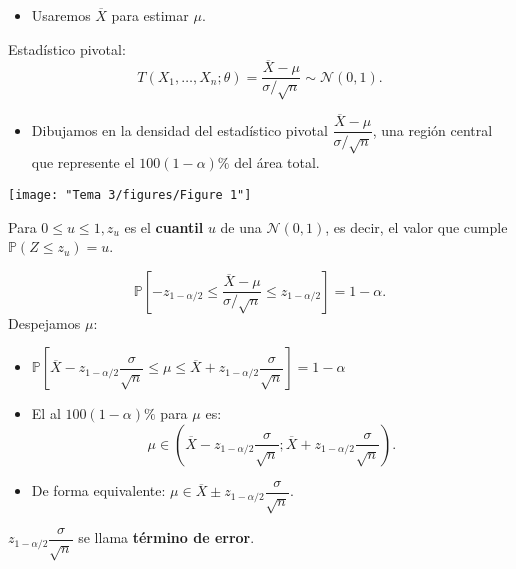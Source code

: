 \begin{itemize}[label=\textbullet]
    \item Usaremos $\overline{X}$ para estimar $\mu$.
\end{itemize}
Estadístico pivotal: \[
    T(X_1,\dots,X_n;\theta)=\dfrac{\overline{X}-\mu}{\sigma / \sqrt{n} }\sim \mathcal{N}(0,1).
\] 
\begin{itemize}[label=\textbullet]
    \item Dibujamos en la densidad del estadístico pivotal $\dfrac{\overline{X}-\mu}{\sigma / \sqrt{n} }$, una región central que represente el $100(1-\alpha)\%$ del área total.
\end{itemize}
\begin{center}
    \texttt{[image: "Tema 3/figures/Figure 1"]}
\end{center}
\begin{tcolorbox}[colback=olive!5!white, colframe=olive!75!black, title=\textbf{Cuantil}]
Para $0\le u\le 1, z_u$ es el \textbf{cuantil} $u$ de una $\mathcal{N}(0,1)$, es decir, el valor que cumple $\mathbb{P}(Z\le z_u)=u$.
\end{tcolorbox}
\[
\mathbb{P}\left[ -z_{1-\alpha /2}\le \dfrac{\overline{X}-\mu}{\sigma / \sqrt{n} }\le z_{1-\alpha /2} \right] =1-\alpha.
\] 
Despejamos $\mu$:
\begin{itemize}[label=\textbullet]
    \item $\mathbb{P}\left[ \overline{X}-z_{1-\alpha / 2}\dfrac{\sigma}{\sqrt{n} }\le \mu\le \overline{X}+z_{1-\alpha /2}\dfrac{\sigma}{\sqrt{n} } \right] =1-\alpha$
    \item El  al $100(1-\alpha)\%$ para $\mu$ es: \[
    \mu\in \left( \overline{X}-z_{1-\alpha / 2}\dfrac{\sigma}{\sqrt{n} };\overline{X}+z_{1-\alpha / 2}\dfrac{\sigma}{\sqrt{n} } \right) .
    \] 
\item De forma equivalente: $\mu\in \overline{X}\pm z_{1-\alpha / 2}\dfrac{\sigma}{\sqrt{n} }.$
\end{itemize}
\begin{tcolorbox}[colback=olive!5!white, colframe=olive!75!black, title=\textbf{Margen de error}]
$z_{1-\alpha /2}\dfrac{\sigma}{\sqrt{n} }$ se llama \textbf{término de error}. 
\end{tcolorbox}
